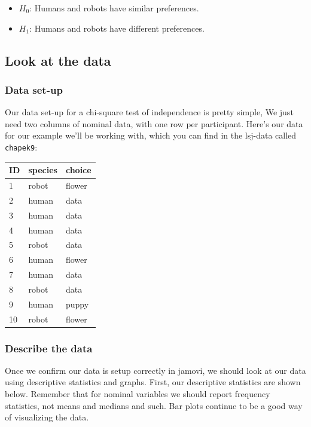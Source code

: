 \documentclass[
]{book}
\begin{document}
\begin{itemize}
\item
  \(H_0\): Humans and robots have similar preferences.
\item
  \(H_1\): Humans and robots have different preferences.
\end{itemize}

\hypertarget{look-at-the-data-4}{%
\subsection{Look at the data}\label{look-at-the-data-4}}

\hypertarget{data-set-up-4}{%
\subsubsection{Data set-up}\label{data-set-up-4}}

Our data set-up for a chi-square test of independence is pretty simple, We just need two columns of nominal data, with one row per participant. Here's our data for our example we'll be working with, which you can find in the lsj-data called \texttt{chapek9}:

\begin{longtable}[]{@{}lll@{}}
\toprule
ID & species & choice \\
\midrule
\endhead
1 & robot & flower \\
2 & human & data \\
3 & human & data \\
4 & human & data \\
5 & robot & data \\
6 & human & flower \\
7 & human & data \\
8 & robot & data \\
9 & human & puppy \\
10 & robot & flower \\
\bottomrule
\end{longtable}

\hypertarget{describe-the-data-3}{%
\subsubsection{Describe the data}\label{describe-the-data-3}}

Once we confirm our data is setup correctly in jamovi, we should look at our data using descriptive statistics and graphs. First, our descriptive statistics are shown below. Remember that for nominal variables we should report frequency statistics, not means and medians and such. Bar plots continue to be a good way of visualizing the data.
\end{document}
